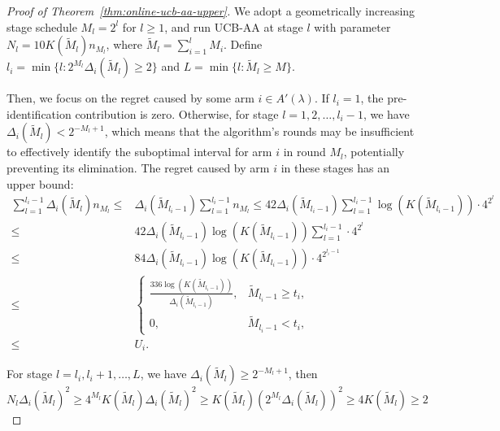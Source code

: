 \documentclass[11pt]{article}
\begin{document}
\begin{proof}[Proof of Theorem~\ref{thm:online-ucb-aa-upper}]
We adopt a geometrically increasing stage schedule $M_l=2^l$ for $l\geq1$, and run UCB-AA at stage $l$ with parameter $N_l=10K(\tilde{M}_l)n_{M_l}$, where $\tilde{M}_l=\sum_{i=1}^l M_i$.
Define $l_i=\min\{l:2^{M_l}\Delta_i(\tilde{M}_l)\geq 2\}$ and $L=\min\{l:\tilde{M}_l\geq M\}$.

Then, we focus on the regret caused by some arm $i\in A'(\lambda)$. If
$l_i=1$, the pre-identification contribution is zero. Otherwise, for stage
$l=1,2,\dots,l_i-1$, we have
$\Delta_i(\tilde{M}_l)< 2^{-M_l+1}$, which means that the algorithm's rounds
may be insufficient to effectively identify the suboptimal interval for arm $i$
in round $M_l$, potentially preventing its elimination. The regret caused by
arm $i$ in these stages has an upper bound:
\begin{align*}
    \sum_{l=1}^{l_i-1} \Delta_i(\tilde{M}_l)n_{M_l} \leq & \Delta_i(\tilde{M}_{l_i-1}) \sum_{l=1}^{l_i-1} n_{M_l} \leq   42\Delta_i(\tilde{M}_{l_i-1})  \sum_{l=1}^{l_i-1} \log(K(\tilde{M}_{l_i-1})) \cdot 4^{2^l}  \\
    \leq & 42 \Delta_i(\tilde{M}_{l_i-1})\log(K(\tilde{M}_{l_i-1}))  \sum_{l=1}^{l_i-1} \cdot 4^{2^l} \\
    \leq & 84 \Delta_i(\tilde{M}_{l_i-1})\log(K(\tilde{M}_{l_i-1}))   \cdot 4^{2^{l_i-1}} \\
    \leq & \begin{cases}
    \displaystyle
    \frac{336\log(K(\tilde{M}_{l_i-1}))}{\Delta_i(\tilde{M}_{l_i-1})},
    & \tilde{M}_{l_i-1}\ge t_i,\\[1.2ex]
    0, & \tilde{M}_{l_i-1}<t_i,
    \end{cases}\\
    \leq & U_i.
\end{align*}

For stage $l=l_i,l_i+1,\dots,L$, we have $\Delta_i(\tilde{M}_l)\geq 2^{-M_l+1}$, then $$N_l\Delta_i(\tilde{M}_l)^2 \geq 4^{M_l}K(\tilde{M}_l) \Delta_i(\tilde{M}_l)^2 \geq K(\tilde{M}_l)(2^{M_l}\Delta_i(\tilde{M}_l))^2\geq 4K(\tilde{M}_l)\geq 2 $$


\end{proof}
\end{document}
